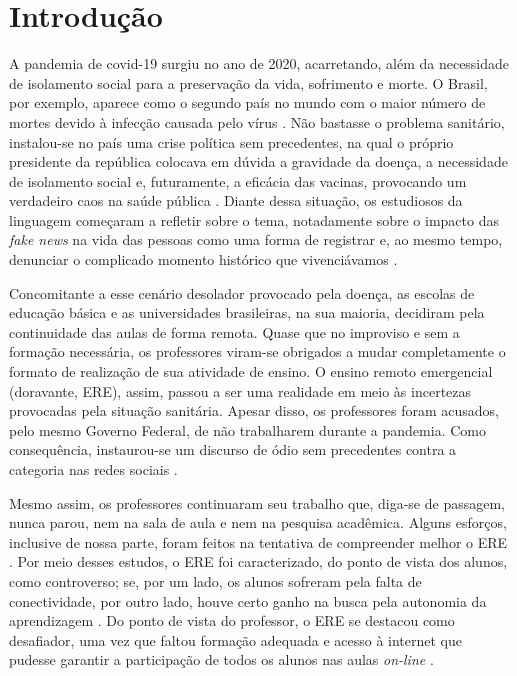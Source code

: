 \documentclass[portuguese]{textolivre}
\begin{document}
\section{Introdução}\label{sec-intro}
A pandemia de covid-19 surgiu no ano de 2020, acarretando, além da necessidade de isolamento social para a preservação da vida, sofrimento e morte. O Brasil, por exemplo, aparece como o segundo país no mundo com o maior número de mortes devido à infecção causada pelo vírus \cite{souzajunior2021transmediatisation}. Não bastasse o problema sanitário, instalou-se no país uma crise política sem precedentes, na qual o próprio presidente da república colocava em dúvida a gravidade da doença, a necessidade de isolamento social e, futuramente, a eficácia das vacinas, provocando um verdadeiro caos na saúde pública \cite{dias2021maismedicos}. Diante dessa situação, os estudiosos da linguagem começaram a refletir sobre o tema, notadamente sobre o impacto das \textit{fake news} na vida das pessoas como uma forma de registrar e, ao mesmo tempo, denunciar o complicado momento histórico que vivenciávamos \cite{lima2021producao,recuero2021discurso}.

Concomitante a esse cenário desolador provocado pela doença, as escolas de educação básica e as universidades brasileiras, na sua maioria, decidiram pela continuidade das aulas de forma remota. Quase que no improviso e sem a formação necessária, os professores viram-se obrigados a mudar completamente o formato de realização de sua atividade de ensino. O ensino remoto emergencial (doravante, ERE), assim, passou a ser uma realidade em meio às incertezas provocadas pela situação sanitária. Apesar disso, os professores foram acusados, pelo mesmo Governo Federal, de não trabalharem durante a pandemia. Como consequência, instaurou-se um discurso de ódio sem precedentes contra a categoria nas redes sociais \cite{araujo2022projeto}.
	
Mesmo assim, os professores continuaram seu trabalho que, diga-se de passagem, nunca parou, nem na sala de aula e nem na pesquisa acadêmica. Alguns esforços, inclusive de nossa parte, foram feitos na tentativa de compreender melhor o ERE \cite{bastos2020narrativas,bastos2021interacoes,paes2020trabalho,costa2022estudo}. Por meio desses estudos, o ERE foi caracterizado, do ponto de vista dos alunos, como controverso; se, por um lado, os alunos sofreram pela falta de conectividade, por outro lado, houve certo ganho na busca pela autonomia da aprendizagem \cite{bastos2020narrativas}. Do ponto de vista do professor, o ERE se destacou como desafiador, uma vez que faltou formação adequada e acesso à internet que pudesse garantir a participação de todos os alunos nas aulas \textit{on-line} \cite{paes2020trabalho}. 
\end{document}
